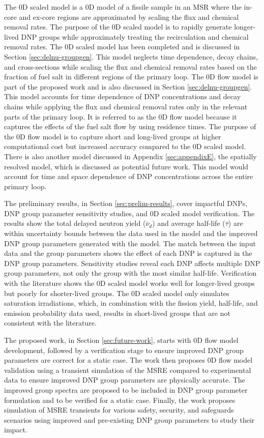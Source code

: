 The 0D scaled model is a 0D model of a fissile sample in an \gls{MSR} where the in-core and ex-core regions are approximated by scaling the flux and chemical removal rates.
The purpose of the 0D scaled model is to rapidly generate longer-lived \gls{DNP} groups while approximately treating the recirculation and chemical removal rates.
The 0D scaled model has been completed and is discussed in Section \ref{sec:delnu-groupgen}.
This model neglects time dependence, decay chains, and cross-sections while scaling the flux and chemical removal rates based on the fraction of fuel salt in different regions of the primary loop.
The 0D flow model is part of the proposed work and is also discussed in Section \ref{sec:delnu-groupgen}.
This model accounts for time dependence of \gls{DNP} concentrations and decay chains while applying the flux and chemical removal rates only in the relevant parts of the primary loop.
It is referred to as the 0D flow model because it captures the effects of the fuel salt flow by using residence times.
The purpose of the 0D flow model is to capture short and long-lived groups at higher computational cost but increased accuracy compared to the 0D scaled model.
There is also another model discussed in Appendix \ref{sec:appendixE}, the spatially resolved model, which is discussed as potential future work.
This model would account for time and space dependence of \gls{DNP} concentrations across the entire primary loop.


The preliminary results, in Section \ref{sec:prelim-results}, cover impactful \glspl{DNP}, \gls{DNP} group parameter sensitivity studies, and 0D scaled model verification.
The results show the total delayed neutron yield ($\bar{\nu}_d$) and average half-life ($\bar{\tau}$) are within uncertainty bounds between the data used in the model and the improved \gls{DNP} group parameters generated with the model.
The match between the input data and the group parameters shows the effect of each \gls{DNP} is captured in the \gls{DNP} group parameters.
Sensitivity studies reveal each \gls{DNP} affects multiple \gls{DNP} group parameters, not only the group with the most similar half-life.
Verification with the literature shows the 0D scaled model works well for longer-lived groups but poorly for shorter-lived groups.
The 0D scaled model only simulates saturation irradiations, which, in combination with the fission yield, half-life, and emission probability data used, results in short-lived groups that are not consistent with the literature.

The proposed work, in Section \ref{sec:future-work}, starts with 0D flow model development, followed by a verification stage to ensure improved \gls{DNP} group parameters are correct for a static case.
The work then proposes 0D flow model validation using a transient simulation of the \gls{MSRE} compared to experimental data to ensure improved \gls{DNP} group parameters are physically accurate.
The improved group spectra are proposed to be included in \gls{DNP} group parameter formulation and to be verified for a static case.
Finally, the work proposes simulation of \gls{MSRE} transients for various safety, security, and safeguards scenarios using improved and pre-existing \gls{DNP} group parameters to study their impact.


